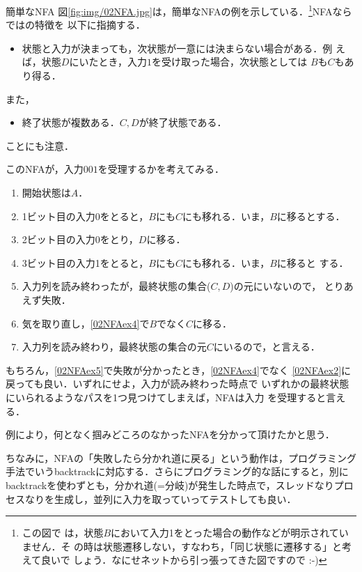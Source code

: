 \begin{myexample}{簡単なNFA} 
 図\ref{fig:img/02NFA.jpg}は，簡単なNFAの例を示している．\footnote{この図で
 は，状態$B$において入力1をとった場合の動作などが明示されていません．そ
 の時は状態遷移しない，すなわち，「同じ状態に遷移する」と考えて良いで
 しょう．なにせネットから引っ張ってきた図ですので :-)}NFAならではの特徴を
 以下に指摘する．
 \begin{itemize}
  \item 状態と入力が決まっても，次状態が一意には決まらない場合がある．例
        えば，状態$D$にいたとき，入力$1$を受け取った場合，次状態としては
        $B$も$C$もあり得る．
 \end{itemize}

また，
\begin{itemize}
 \item 終了状態が複数ある．$C, D$が終了状態である．
\end{itemize}
ことにも注意．

 このNFAが，入力$001$を受理するかを考えてみる．
\begin{enumerate}
 \item 開始状態は$A$．
 \item 1ビット目の入力0をとると，$B$にも$C$にも移れる．いま，$B$に移るとする．
       \label{02NFAex2}
 \item 2ビット目の入力0をとり，$D$に移る．
 \item 3ビット目の入力1をとると，$B$にも$C$にも移れる．いま，$B$に移ると
       する． \label{02NFAex4}
 \item 入力列を読み終わったが，最終状態の集合($C, D$)の元にいないので，
       とりあえず失敗． \label{02NFAex5}
 \item 気を取り直し，\ref{02NFAex4}で$B$でなく$C$に移る．
 \item 入力列を読み終わり，最終状態の集合の元$C$にいるので，と言える．
\end{enumerate}
 もちろん，\ref{02NFAex5}で失敗が分かったとき，\ref{02NFAex4}でなく
 \ref{02NFAex2}に戻っても良い．いずれにせよ，入力が読み終わった時点で
 いずれかの最終状態にいられるようなパスを1つ見つけてしまえば，NFAは入力
 を受理すると言える．
\end{myexample}

例により，何となく掴みどころのなかったNFAを分かって頂けたかと思う．

ちなみに，NFAの「失敗したら分かれ道に戻る」という動作は，プログラミング
手法でいうbacktrackに対応する．さらにプログラミング的な話にすると，別に
backtrackを使わずとも，分かれ道(=分岐)が発生した時点で，スレッドなりプロ
セスなりを生成し，並列に入力を取っていってテストしても良い．

